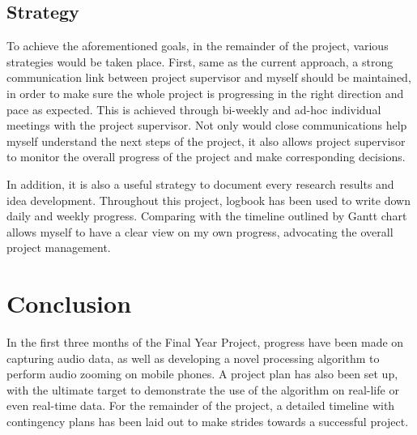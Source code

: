 \documentclass[a4paper,twoside,12pt,hidelinks]{article}
\begin{document}
\subsection{Strategy}
To achieve the aforementioned goals, in the remainder of the project, various strategies would be taken place. First, same as the current approach, a strong communication link between project supervisor and myself should be maintained, in order to make sure the whole project is progressing in the right direction and pace as expected. This is achieved through bi-weekly and ad-hoc individual meetings with the project supervisor. Not only would close communications help myself understand the next steps of the project, it also allows project supervisor to monitor the overall progress of the project and make corresponding decisions. 

In addition, it is also a useful strategy to document every research results and idea development. Throughout this project, logbook has been used to write down daily and weekly progress. Comparing with the timeline outlined by Gantt chart allows myself to have a clear view on my own progress, advocating the overall project management. 

\section{Conclusion}
In the first three months of the Final Year Project, progress have been made on capturing audio data, as well as developing a novel processing algorithm to perform audio zooming on mobile phones. A project plan has also been set up, with the ultimate target to demonstrate the use of the algorithm on real-life or even real-time data. For the remainder of the project, a detailed timeline with contingency plans has been laid out to make strides towards a successful project.
\end{document}
